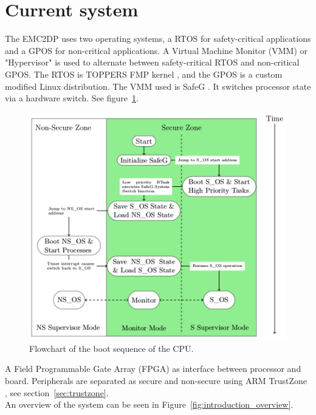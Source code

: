 \section{Current system}
\label{sec:lit_emc2mcs}
The EMC2DP uses two operating systems, a RTOS for safety-critical applications and a GPOS for non-critical applications. A Virtual Machine Monitor (VMM) or "Hypervisor" is used to alternate between safety-critical RTOS and non-critical GPOS. The RTOS is TOPPERS FMP kernel \cite{website:FMP}, and the GPOS is a custom modified Linux distribution. The VMM used is SafeG \cite{website:safeg}. It switches processor state via a hardware switch. See figure~\ref{fig:modeswitch}.

\begin{figure}[H]
\centering
\includegraphics[width=\textwidth]{./img/literature_modeswitch.png}
\caption{Flowchart of the boot sequence of the CPU. \cite{zaki2016}}\label{fig:modeswitch}
\end{figure}

A Field Programmable Gate Array (FPGA) as interface between processor and board. Peripherals are separated as secure and non-secure using ARM TrustZone \cite{website:ARM}, see section~\ref{sec:trustzone}. \\ %

An overview of the system can be seen in Figure~\ref{fig:introduction_overview}.

